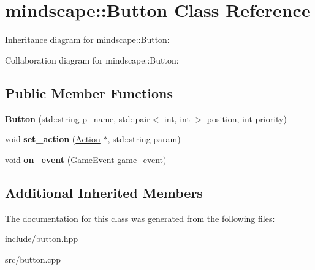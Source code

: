 \hypertarget{classmindscape_1_1_button}{}\section{mindscape\+:\+:Button Class Reference}
\label{classmindscape_1_1_button}


Inheritance diagram for mindscape\+:\+:Button\+:


Collaboration diagram for mindscape\+:\+:Button\+:
\subsection*{Public Member Functions}
\begin{DoxyCompactItemize}
\item 
{\bfseries Button} (std\+::string p\+\_\+name, std\+::pair$<$ int, int $>$ position, int priority)\hypertarget{classmindscape_1_1_button_a7a787c4e0289867988522f676fcb5f76}{}\label{classmindscape_1_1_button_a7a787c4e0289867988522f676fcb5f76}

\item 
void {\bfseries set\+\_\+action} (\hyperlink{classmindscape_1_1_action}{Action} $\ast$, std\+::string param)\hypertarget{classmindscape_1_1_button_ae097539464c762e064650be581b1a5d8}{}\label{classmindscape_1_1_button_ae097539464c762e064650be581b1a5d8}

\item 
void {\bfseries on\+\_\+event} (\hyperlink{class_game_event}{Game\+Event} game\+\_\+event)\hypertarget{classmindscape_1_1_button_a1c5f7eea78429535c6cc76bcdf778a94}{}\label{classmindscape_1_1_button_a1c5f7eea78429535c6cc76bcdf778a94}

\end{DoxyCompactItemize}
\subsection*{Additional Inherited Members}


The documentation for this class was generated from the following files\+:\begin{DoxyCompactItemize}
\item 
include/button.\+hpp\item 
src/button.\+cpp\end{DoxyCompactItemize}
